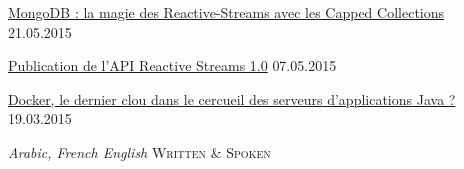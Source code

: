 \documentclass[10pt,a4paper]{article}
\begin{document}
  
\headedsection
  {\href{http://www.infoq.com/fr/news/2015/05/reactive-streams-capped-collecti}{MongoDB : la magie des Reactive-Streams avec les Capped Collections}}
  {\textsc{21.05.2015}}   

\headedsection
  {\href{http://www.infoq.com/fr/news/2015/05/api-reactive-streams-1-0}{Publication de l’API Reactive Streams 1.0}}
  {\textsc{07.05.2015}} 

\headedsection
  {\href{http://www.infoq.com/fr/news/2015/03/docker-vs-serveurs-app-java}{Docker, le dernier clou dans le cercueil des serveurs d’applications Java ?}}
  {\textsc{19.03.2015}} 


\spacedhrule{0em}{-0.4em}

\headedsection
  {\sl Arabic, French English} 
  {\textsc{Written \& Spoken}} 
\end{document}
